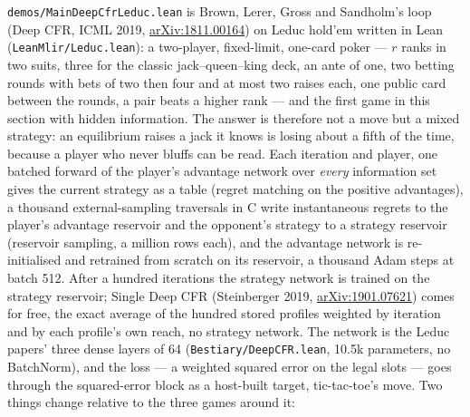 \texttt{demos/MainDeepCfrLeduc.lean} is Brown, Lerer, Gross and Sandholm's loop (Deep CFR,
ICML 2019, \href{https://arxiv.org/abs/1811.00164}{arXiv:1811.00164}) on Leduc hold'em
written in Lean (\texttt{LeanMlir/Leduc.lean}): a two-player, fixed-limit, one-card poker
--- $r$ ranks in two suits, three for the classic jack--queen--king deck, an ante of one,
two betting rounds with bets of two then four and at most two raises each, one public
card between the rounds, a pair beats a higher rank --- and the first game in this
section with hidden information. The answer is therefore not a move but a mixed
strategy: an equilibrium raises a jack it knows is losing about a fifth of the time,
because a player who never bluffs can be read. Each iteration and player, one batched
forward of the player's advantage network over \emph{every} information set gives the
current strategy as a table (regret matching on the positive advantages), a thousand
external-sampling traversals in C write instantaneous regrets to the player's advantage
reservoir and the opponent's strategy to a strategy reservoir (reservoir sampling, a
million rows each), and the advantage network is re-initialised and retrained from
scratch on its reservoir, a thousand Adam steps at batch 512. After a hundred iterations
the strategy network is trained on the strategy reservoir; Single Deep CFR (Steinberger
2019, \href{https://arxiv.org/abs/1901.07621}{arXiv:1901.07621}) comes for free, the
exact average of the hundred stored profiles weighted by iteration and by each profile's
own reach, no strategy network. The network is the Leduc papers' three dense layers of
64 (\texttt{Bestiary/DeepCFR.lean}, 10.5k parameters, no BatchNorm), and the loss --- a
weighted squared error on the legal slots --- goes through the squared-error block as a
host-built target, tic-tac-toe's move. Two things change relative to the three games
around it:

